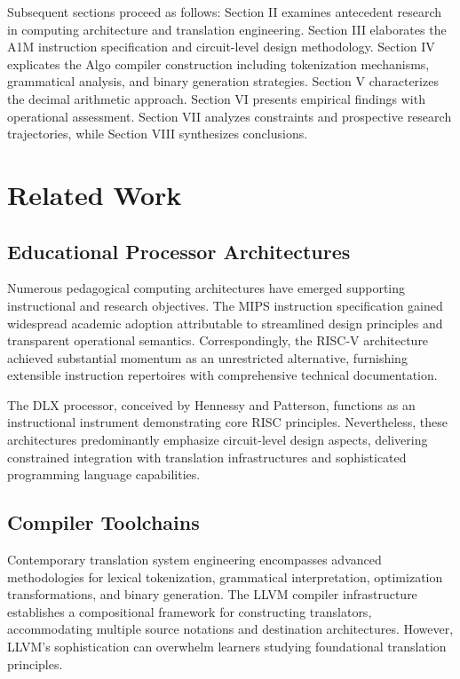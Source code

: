 \documentclass[conference,10pt,twocolumn]{IEEEtran}
\begin{document}
Subsequent sections proceed as follows: Section II examines antecedent research in computing architecture and translation engineering. Section III elaborates the A1M instruction specification and circuit-level design methodology. Section IV explicates the Algo compiler construction including tokenization mechanisms, grammatical analysis, and binary generation strategies. Section V characterizes the decimal arithmetic approach. Section VI presents empirical findings with operational assessment. Section VII analyzes constraints and prospective research trajectories, while Section VIII synthesizes conclusions.

\section{Related Work}

\subsection{Educational Processor Architectures}

Numerous pedagogical computing architectures have emerged supporting instructional and research objectives. The MIPS instruction specification gained widespread academic adoption attributable to streamlined design principles and transparent operational semantics. Correspondingly, the RISC-V architecture achieved substantial momentum as an unrestricted alternative, furnishing extensible instruction repertoires with comprehensive technical documentation.

The DLX processor, conceived by Hennessy and Patterson, functions as an instructional instrument demonstrating core RISC principles. Nevertheless, these architectures predominantly emphasize circuit-level design aspects, delivering constrained integration with translation infrastructures and sophisticated programming language capabilities.

\subsection{Compiler Toolchains}

Contemporary translation system engineering encompasses advanced methodologies for lexical tokenization, grammatical interpretation, optimization transformations, and binary generation. The LLVM compiler infrastructure establishes a compositional framework for constructing translators, accommodating multiple source notations and destination architectures. However, LLVM's sophistication can overwhelm learners studying foundational translation principles.
\end{document}
